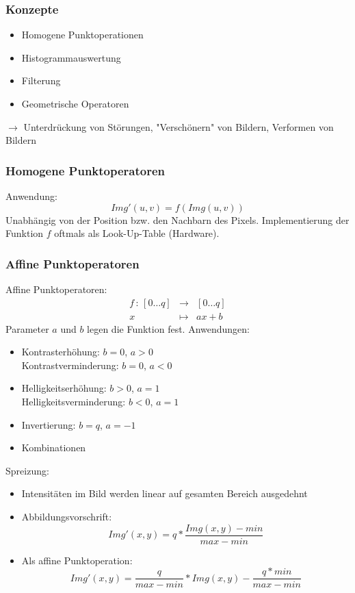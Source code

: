 \subsubsection*{Konzepte}

\begin{itemize}
\item Homogene Punktoperationen
\item Histogrammauswertung
\item Filterung
\item Geometrische Operatoren
\end{itemize}
$\to$ Unterdrückung von Störungen, "{}Verschönern"{} von Bildern, Verformen von Bildern

\subsubsection*{Homogene Punktoperatoren}

Anwendung: $$Img'(u,v) = f(Img(u,v))$$
Unabhängig von der Position bzw. den Nachbarn des Pixels. Implementierung der Funktion $f$ oftmals als Look-Up-Table (Hardware).

\subsubsection*{Affine Punktoperatoren}

Affine Punktoperatoren:
\begin{eqnarray*}
f \, : \, [0 \dots q] &\to& [0 \dots q] \\ x &\mapsto& ax+b
\end{eqnarray*}
Parameter $a$ und $b$ legen die Funktion fest. Anwendungen:
\begin{itemize}
\item Kontrasterhöhung: $b=0$, $a > 0$ \\ Kontrastverminderung: $b=0$, $a < 0$
\item Helligkeitserhöhung: $b > 0$, $a = 1$ \\ Helligkeitsverminderung: $b < 0$, $a = 1$
\item Invertierung: $b = q$, $a = -1$
\item Kombinationen
\end{itemize}

Spreizung:
\begin{itemize}
\item Intensitäten im Bild werden linear auf gesamten Bereich ausgedehnt
\item Abbildungsvorschrift: \[Img'(x,y) = q*\frac{Img(x,y)-min}{max-min}\]
\item Als affine Punktoperation: \[Img'(x,y) =  \frac{q}{max-min}*Img(x,y)-\frac{q*min}{max-min}\]
\end{itemize}

